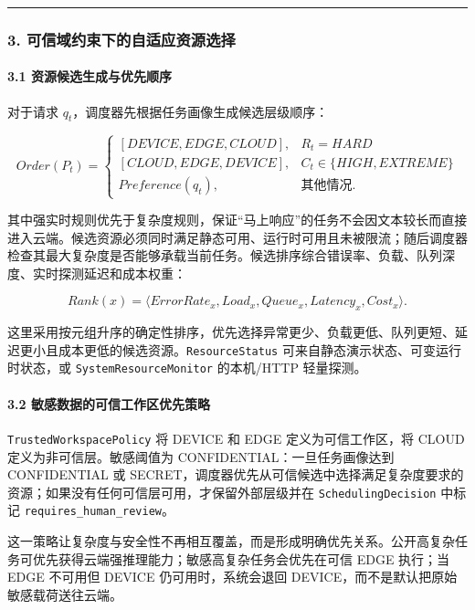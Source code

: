 \documentclass[UTF8,a4paper,12pt]{ctexart}
\begin{document}
\begin{center}\rule{0.5\linewidth}{0.5pt}\end{center}

\subsubsection{3. 可信域约束下的自适应资源选择}

\paragraph{3.1 资源候选生成与优先顺序}

对于请求 \(q_t\)，调度器先根据任务画像生成候选层级顺序：

\[
Order(P_t)=
\begin{cases}
[DEVICE,EDGE,CLOUD],& R_t=HARD\\
[CLOUD,EDGE,DEVICE],& C_t\in\{HIGH,EXTREME\}\\
Preference(q_t),& \text{其他情况}.
\end{cases}
\]

其中强实时规则优先于复杂度规则，保证``马上响应''的任务不会因文本较长而直接进入云端。候选资源必须同时满足静态可用、运行时可用且未被限流；随后调度器检查其最大复杂度是否能够承载当前任务。候选排序综合错误率、负载、队列深度、实时探测延迟和成本权重：

\[
Rank(x)=\langle ErrorRate_x,Load_x,Queue_x,Latency_x,Cost_x\rangle.
\]

这里采用按元组升序的确定性排序，优先选择异常更少、负载更低、队列更短、延迟更小且成本更低的候选资源。\texttt{ResourceStatus} 可来自静态演示状态、可变运行时状态，或 \texttt{SystemResourceMonitor} 的本机/HTTP 轻量探测。

\paragraph{3.2 敏感数据的可信工作区优先策略}

\texttt{TrustedWorkspacePolicy} 将 DEVICE 和 EDGE 定义为可信工作区，将 CLOUD 定义为非可信层。敏感阈值为 CONFIDENTIAL：一旦任务画像达到 CONFIDENTIAL 或 SECRET，调度器优先从可信候选中选择满足复杂度要求的资源；如果没有任何可信层可用，才保留外部层级并在 \texttt{SchedulingDecision} 中标记 \texttt{requires\_human\_review}。

这一策略让复杂度与安全性不再相互覆盖，而是形成明确优先关系。公开高复杂任务可优先获得云端强推理能力；敏感高复杂任务会优先在可信 EDGE 执行；当 EDGE 不可用但 DEVICE 仍可用时，系统会退回 DEVICE，而不是默认把原始敏感载荷送往云端。
\end{document}
